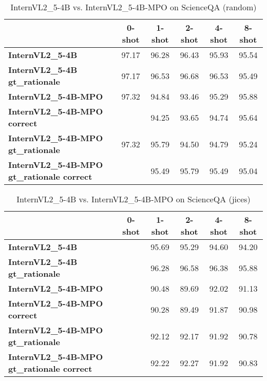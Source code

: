 \begin{table}
\caption{InternVL2\_5-4B vs. InternVL2\_5-4B-MPO on ScienceQA (random)}
\label{tab:InternVL2_5-4B_ScienceQA_TRAIN_random}
\begin{tabular}{lccccc}
\toprule
 & 0-shot & 1-shot & 2-shot & 4-shot & 8-shot \\
\midrule
\textbf{InternVL2\_5-4B} & 97.17 & 96.28 & 96.43 & 95.93 & 95.54 \\
\textbf{InternVL2\_5-4B gt\_rationale} & 97.17 & 96.53 & 96.68 & 96.53 & 95.49 \\
\textbf{InternVL2\_5-4B-MPO} & 97.32 & 94.84 & 93.46 & 95.29 & 95.88 \\
\textbf{InternVL2\_5-4B-MPO correct} &  & 94.25 & 93.65 & 94.74 & 95.64 \\
\textbf{InternVL2\_5-4B-MPO gt\_rationale} & 97.32 & 95.79 & 94.50 & 94.79 & 95.24 \\
\textbf{InternVL2\_5-4B-MPO gt\_rationale correct} &  & 95.49 & 95.79 & 95.49 & 95.04 \\
\bottomrule
\end{tabular}
\end{table}


\begin{table}
\caption{InternVL2\_5-4B vs. InternVL2\_5-4B-MPO on ScienceQA (jices)}
\label{tab:InternVL2_5-4B_ScienceQA_TRAIN_jices}
\begin{tabular}{lccccc}
\toprule
 & 0-shot & 1-shot & 2-shot & 4-shot & 8-shot \\
\midrule
\textbf{InternVL2\_5-4B} &  & 95.69 & 95.29 & 94.60 & 94.20 \\
\textbf{InternVL2\_5-4B gt\_rationale} &  & 96.28 & 96.58 & 96.38 & 95.88 \\
\textbf{InternVL2\_5-4B-MPO} &  & 90.48 & 89.69 & 92.02 & 91.13 \\
\textbf{InternVL2\_5-4B-MPO correct} &  & 90.28 & 89.49 & 91.87 & 90.98 \\
\textbf{InternVL2\_5-4B-MPO gt\_rationale} &  & 92.12 & 92.17 & 91.92 & 90.78 \\
\textbf{InternVL2\_5-4B-MPO gt\_rationale correct} &  & 92.22 & 92.27 & 91.92 & 90.83 \\
\bottomrule
\end{tabular}
\end{table}


